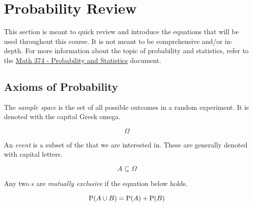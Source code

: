\section{Probability Review}\label{sec:Probability_Review}
This section is meant to quick review and introduce the equations that will be used throughout this course.
It is not meant to be comprehensive and/or in-depth.
For more information about the topic of probability and statistics, refer to the \href{file:./Math_374-Reference_Sheet.pdf}{Math 374 - Probability and Statistics} document.

\subsection{Axioms of Probability}\label{subsec:Axioms_of_Probability}
\begin{definition}\label{def:Sample_Space}
  The \emph{sample space} is the set of all possible outcomes in a random experiment.
  It is denoted with the capital Greek omega.

  \begin{equation}\label{eq:Sample_Space}
    \Omega
  \end{equation}
\end{definition}

\begin{definition}[Event]\label{def:Event}
  An \emph{event} is a subset of the  that we are interested in.
  These are generally denoted with capital letters.

  \begin{equation}\label{eq:Event}
    A \subseteq \Omega
  \end{equation}
\end{definition}

\begin{definition}\label{def:Mutually_Exclusive}
  Any two s are \emph{mutually exclusive} if the equation below holds.

  \begin{equation}\label{eq:Mutually_Exclusive}
    \operatorname{\operatorname{P}}(A \cup B) = \operatorname{\operatorname{P}}(A) + \operatorname{\operatorname{P}}(B)
  \end{equation}
\end{definition}

